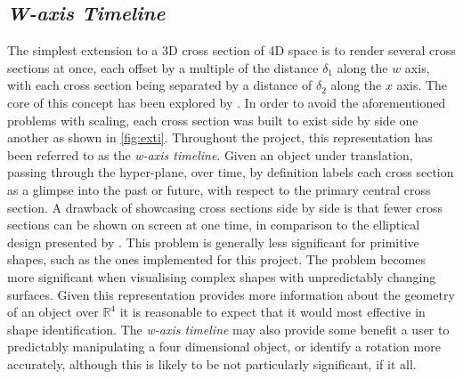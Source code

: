 \documentclass{l4proj}
\begin{document}
\subsection{\textit{W-axis Timeline}}
The simplest extension to a 3D cross section of 4D space is to render several cross sections at once, each offset by a multiple of the distance $\delta_1$ along the \(w\) axis, with each cross section being separated by a distance of $\delta_2$ along the \(x\) axis. 
The core of this concept has been explored by \citet{kageyama_visualization_2015}. In order to avoid the aforementioned problems with scaling, each cross section was built to exist side by side one another as shown in \cref{fig:exti}. 
Throughout the project, this representation has been referred to as the \textit{w-axis timeline}. Given an object under translation, passing through the hyper-plane, over time, by definition labels each cross section as a glimpse into the past or future, with respect to the primary central cross section.
A drawback of showcasing cross sections side by side is that fewer cross sections can be shown on screen at one time, in comparison to the elliptical design presented by \citet{kageyama_visualization_2015}. This problem is generally less significant for primitive shapes, such as the ones implemented for this project. The problem becomes more significant when visualising complex shapes with unpredictably changing surfaces.
Given this representation provides more information about the geometry of an object over $\mathbb{R}^4$ it is reasonable to expect that it would most effective in shape identification. The \textit{w-axis timeline} may also provide some benefit a user to predictably manipulating a four dimensional object, or identify a rotation more accurately, although this is likely to be not particularly significant, if it all.
\end{document}
